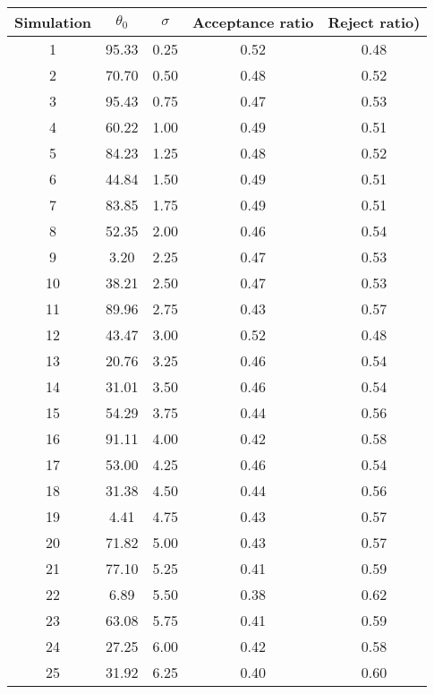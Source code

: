 \begin{center}
\begin{table}\label{tb: Simulation Metropolis}
\begin{tabular}{|ccccc|}\hline 
Simulation & $\theta_0$ & $\sigma$ & Acceptance ratio & Reject ratio)\\ \hline 
1 &    95.33 &     0.25 &     0.52 &     0.48 \\  \hline 
2 &    70.70 &     0.50 &     0.48 &     0.52 \\  
3 &    95.43 &     0.75 &     0.47 &     0.53 \\  
4 &    60.22 &     1.00 &     0.49 &     0.51 \\  
5 &    84.23 &     1.25 &     0.48 &     0.52 \\  
6 &    44.84 &     1.50 &     0.49 &     0.51 \\  
7 &    83.85 &     1.75 &     0.49 &     0.51 \\  
8 &    52.35 &     2.00 &     0.46 &     0.54 \\  
9 &     3.20 &     2.25 &     0.47 &     0.53 \\  
10 &    38.21 &     2.50 &     0.47 &     0.53 \\  
11 &    89.96 &     2.75 &     0.43 &     0.57 \\  
12 &    43.47 &     3.00 &     0.52 &     0.48 \\  
13 &    20.76 &     3.25 &     0.46 &     0.54 \\  
14 &    31.01 &     3.50 &     0.46 &     0.54 \\  
15 &    54.29 &     3.75 &     0.44 &     0.56 \\  
16 &    91.11 &     4.00 &     0.42 &     0.58 \\  
17 &    53.00 &     4.25 &     0.46 &     0.54 \\  
18 &    31.38 &     4.50 &     0.44 &     0.56 \\  
19 &     4.41 &     4.75 &     0.43 &     0.57 \\  
20 &    71.82 &     5.00 &     0.43 &     0.57 \\  
21 &    77.10 &     5.25 &     0.41 &     0.59 \\  
22 &     6.89 &     5.50 &     0.38 &     0.62 \\  
23 &    63.08 &     5.75 &     0.41 &     0.59 \\  
24 &    27.25 &     6.00 &     0.42 &     0.58 \\  
25 &    31.92 &     6.25 &     0.40 &     0.60 \\  

\end{tabular}
\end{table}
\end{center}
